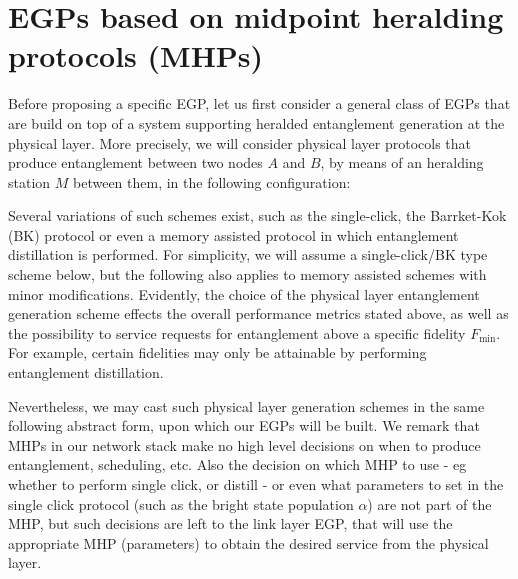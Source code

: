 \documentclass{article}
\begin{document}
\section{EGPs based on midpoint heralding protocols (MHPs)}
Before proposing a specific EGP, let us first consider a general class of EGPs that are build 
on top of a system supporting heralded entanglement generation at the physical layer. 
More precisely, we will consider physical layer protocols that  produce entanglement between two nodes $A$ and $B$, by means of an heralding station $M$ between them, in the following configuration:
\smallskip
\begin{sequencediagram}
\end{sequencediagram}
Several variations of such schemes exist, such as the single-click, the Barrket-Kok (BK) protocol or even a memory assisted protocol in which entanglement distillation is performed. 
For simplicity, we will assume a single-click/BK type scheme below, but the following also applies to memory assisted schemes with minor modifications.
Evidently, the choice of the physical layer entanglement generation scheme effects the overall performance metrics stated above, as well as the possibility to service requests
for entanglement above a specific fidelity $F_{\min}$. For example, certain fidelities may only be attainable by performing entanglement distillation.

Nevertheless, we may cast such physical layer generation schemes in the same following abstract form, upon which our EGPs will be built.
We remark that MHPs in our network stack make no high level decisions on when to produce entanglement, scheduling, etc. Also the decision on which MHP to use - eg whether to perform single click, or distill - or even what parameters to set in the single click protocol (such as the bright state population $\alpha$) are not part of the MHP, but such decisions are left to the link layer EGP, that will use the appropriate MHP (parameters) to obtain the desired service from the physical layer. 
\end{document}
